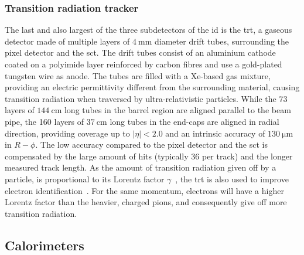 \subsubsection{Transition radiation tracker}

The last and also largest of the three subdetectors of the \gls{id} is the \gls{trt}, a gaseous detector made of multiple layers of $\SI{4}{\milli\meter}$ diameter drift tubes, surrounding the pixel detector and the \gls{sct}. The drift tubes consist of an aluminium cathode coated on a polyimide layer reinforced by carbon fibres and use a gold-plated tungsten wire as anode. The tubes are filled with a Xe-based gas mixture, providing an electric permittivity different from the surrounding material, causing transition radiation when traversed by ultra-relativistic particles. While the 73 layers of $\SI{144}{\centi\meter}$ long tubes in the barrel region are aligned parallel to the beam pipe, the 160 layers of $\SI{37}{\centi\meter}$ long tubes in the end-caps are aligned in radial direction, providing coverage up to $\vert\eta\vert <2.0$ and an intrinsic accuracy of $\SI{130}{\micro\meter}$ in $R-\phi$. The low accuracy compared to the pixel detector and the \gls{sct} is compensated by the large amount of hits (typically $36$ per track) and the longer measured track length. As the amount of transition radiation given off by a particle, is proportional to its Lorentz factor $\gamma$~\cite{pdg2020}, the \gls{trt} is also used to improve electron identification~\cite{ATLAS-CONF-2011-128}. For the same momentum, electrons will have a higher Lorentz factor than the heavier, charged pions, and consequently give off more transition radiation.

\subsection{Calorimeters}

